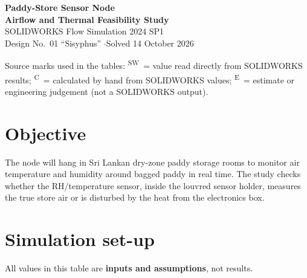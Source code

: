\documentclass[11pt,a4paper]{article}
\newcommand{\SW}{\textsuperscript{SW}}
\newcommand{\CALC}{\textsuperscript{C}}
\newcommand{\EST}{\textsuperscript{E}}
\begin{document}
\begin{center}
{\LARGE\bfseries Paddy-Store Sensor Node\\[4pt] Airflow and Thermal Feasibility Study}\\[10pt]
{\large SOLIDWORKS Flow Simulation 2024 SP1}\\[4pt]
Design No.~01 ``Sisyphus'' \quad$\cdot$\quad Solved 14 October 2026
\end{center}

\vspace{6pt}
\noindent{}

\vspace{4pt}
\small Source marks used in the tables:
\SW\ = value read directly from SOLIDWORKS results;
\CALC\ = calculated by hand from SOLIDWORKS values;
\EST\ = estimate or engineering judgement (not a SOLIDWORKS output).
\normalsize

\section{Objective}
The node will hang in Sri Lankan dry-zone paddy storage rooms to monitor air temperature and
humidity around bagged paddy in real time. The study checks whether the RH/temperature sensor,
inside the louvred sensor holder, measures the true store air or is disturbed by the heat from
the electronics box.

\section{Simulation set-up}
All values in this table are \textbf{inputs and assumptions}, not results.
\end{document}
